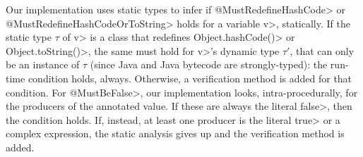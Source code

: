 Our implementation uses static types to infer if
\<@MustRedefineHashCode> or \<@MustRedefineHashCodeOrToString> holds for a variable \<v>,
statically. If the static type
$\tau$ of \<v> is a class that redefines \<Object.hashCode()> or \<Object.toString()>,
the same must hold for \<v>'s dynamic type $\tau'$, that can only be an
instance of $\tau$ (since Java and Java bytecode are strongly-typed):
the run-time condition holds, always.
Otherwise, a verification method is added for that condition.
For \<@MustBeFalse>, our implementation looks, intra-procedurally, for
the producers of the annotated value.
If these are always the literal \<false>, then the condition holds.
If, instead, at least one producer is the literal \<true> or a complex expression,
the static analysis gives up and the verification method is added.
